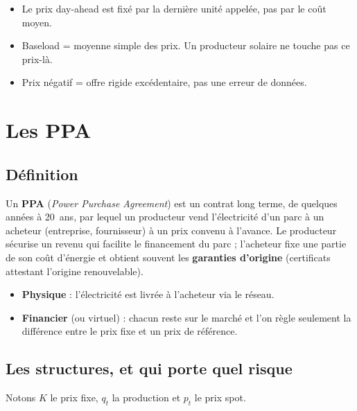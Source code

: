 \documentclass[11pt,a4paper]{article}
\begin{document}
\begin{aretenir}
\begin{itemize}[leftmargin=*]
\item Le prix day-ahead est fixé par la dernière unité appelée, pas par le coût moyen.
\item Baseload = moyenne simple des prix. Un producteur solaire ne touche pas ce prix-là.
\item Prix négatif = offre rigide excédentaire, pas une erreur de données.
\end{itemize}
\end{aretenir}

\section{Les PPA}

\subsection{Définition}

Un \textbf{PPA} (\emph{Power Purchase Agreement}) est un contrat long terme, de quelques années à 20~ans, par lequel un
producteur vend l'électricité d'un parc à un acheteur (entreprise, fournisseur) à un prix convenu à l'avance.
Le producteur sécurise un revenu qui facilite le financement du parc ; l'acheteur fixe une partie de son
coût d'énergie et obtient souvent les \textbf{garanties d'origine} (certificats attestant l'origine renouvelable).

\begin{itemize}
\item \textbf{Physique} : l'électricité est livrée à l'acheteur via le réseau.
\item \textbf{Financier} (ou virtuel) : chacun reste sur le marché et l'on règle seulement la différence entre
le prix fixe et un prix de référence.
\end{itemize}

\subsection{Les structures, et qui porte quel risque}

Notons $K$ le prix fixe, $q_t$ la production et $p_t$ le prix spot.
\end{document}
